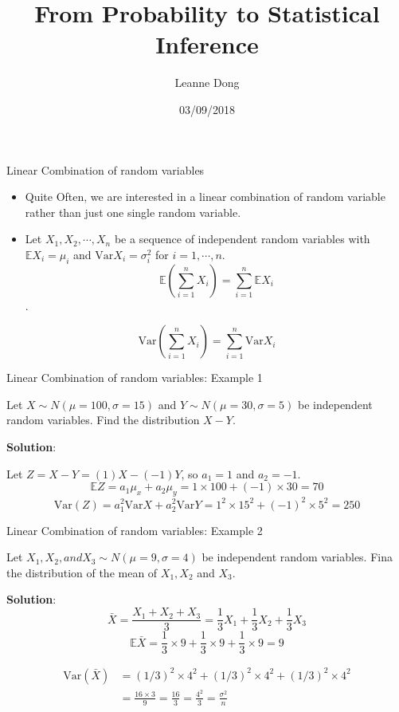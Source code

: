 \documentclass[ignorenonframetext,]{beamer}
\title{From Probability to Statistical Inference}
\author{Leanne Dong}
\date{03/09/2018}
\begin{document}
\frame{\titlepage}

\begin{frame}{Linear Combination of random variables}

\begin{itemize}
\item
  Quite Often, we are interested in a linear combination of random
  variable rather than just one single random variable.
\item
  Let \(X_1,X_2,\cdots,X_n\) be a sequence of independent random
  variables with \(\mathbb{E}X_i=\mu_i\) and
  \(\text{Var}X_i=\sigma^2_i\) for \(i=1,\cdots,n\).
  \[\mathbb{E}(\sum^n_{i=1}X_i)=\sum^n_{i=1}\mathbb{E}X_i\].
\end{itemize}

\[\text{Var}(\sum^n_{i=1}X_i)=\sum^n_{i=1}\text{Var}X_i\]

\end{frame}

\begin{frame}{Linear Combination of random variables: Example 1}

Let \(X\sim N(\mu=100,\sigma=15)\) and \(Y\sim N(\mu=30,\sigma=5)\) be
independent random variables. Find the distribution \(X-Y\).

\textbf{Solution}:

Let \(Z=X-Y=(1)X-(-1)Y\), so \(a_1=1\) and \(a_2=-1\).
\[\mathbb{E}Z=a_1\mu_x+a_2\mu_y=1\times 100+(-1)\times 30=70\]
\[\text{Var}(Z)=a^2_1\text{Var}X+a^2_2\text{Var}Y=1^2\times 15^2+(-1)^2\times 5^2=250\]

\end{frame}

\begin{frame}{Linear Combination of random variables: Example 2}

Let \(X_1,X_2, and X_3\sim N(\mu=9,\sigma=4)\) be independent random
variables. Fina the distribution of the mean of \(X_1,X_2\) and \(X_3\).

\textbf{Solution}:
\[\bar{X}=\frac{X_1+X_2+X_3}{3}=\frac{1}{3}X_1+\frac{1}{3}X_2+\frac{1}{3}X_3\]
\[\mathbb{E}\bar{X}=\frac{1}{3}\times 9+\frac{1}{3}\times 9+\frac{1}{3}\times 9=9\]

\begin{align*}
\text{Var}(\bar{X})&=(1/3)^2\times 4^2+(1/3)^2\times 4^2+(1/3)^2\times 4^2\\
&=\frac{16\times 3}{9}=\frac{16}{3}=\frac{4^2}{3}=\frac{\sigma^2}{n}
\end{align*}

\end{frame}
\end{document}
